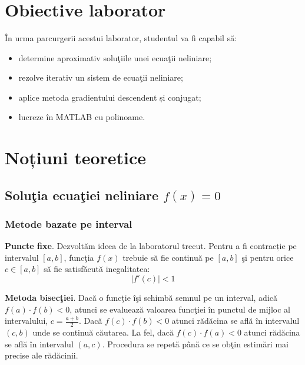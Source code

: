 \documentclass{exam}
\title{
\textmd{\textbf{\MNLabTitle}}
\author{}
\date{}
}
\begin{document}
\begin{coverpages}
	\maketitle
	\thispagestyle{empty}
	\tableofcontents
\end{coverpages}

\section{Obiective laborator}
În urma parcurgerii acestui laborator, studentul va fi capabil să:
\begin{itemize}
	\item determine aproximativ soluţiile unei ecuaţii neliniare;
	\item rezolve iterativ un sistem de ecuaţii neliniare;
	\item aplice metoda gradientului descendent și conjugat;
	\item lucreze în MATLAB cu polinoame.
\end{itemize}

\section{Noțiuni teoretice}

\subsection{Soluţia ecuaţiei neliniare $f(x) = 0$}

\subsubsection{Metode bazate pe interval}

\textbf{Puncte fixe}. Dezvoltăm ideea de la laboratorul trecut. Pentru a fi
contracție pe intervalul $[a, b]$, funcţia $f(x)$ trebuie să fie continuă pe
$[a, b]$ şi pentru orice $c \in [a, b]$ să fie satisfăcută inegalitatea:
\begin{equation*}
	|f'(c)| < 1
\end{equation*}

\textbf{Metoda bisecţiei}. Dacă o funcţie îşi schimbă semnul pe un interval,
adică $f(a)\cdot f(b)<0$, atunci se evaluează valoarea funcţiei în punctul de
mijloc al intervalului, $c = \frac{a + b}{2}$. Dacă  $f(c)\cdot f(b)<0$ atunci
rădăcina se află în intervalul $(c, b)$ unde se continuă căutarea. La fel, dacă
$f(c)\cdot f(a)<0$ atunci rădăcina se află în intervalul $(a, c)$. Procedura se
repetă până ce se obţin estimări mai precise ale rădăcinii.
\end{document}

